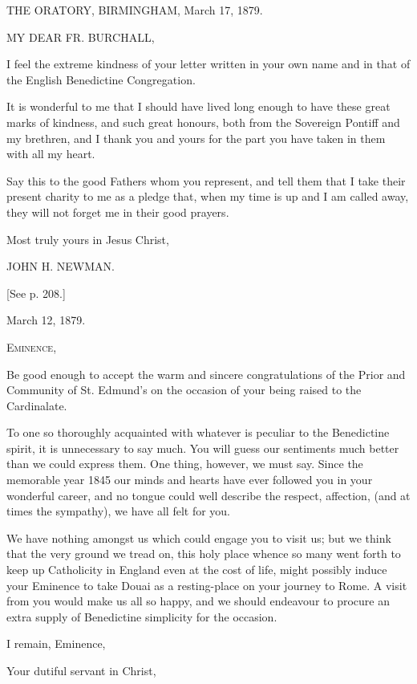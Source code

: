 
THE ORATORY, BIRMINGHAM,
March 17, 1879.

MY DEAR FR.
BURCHALL,

I feel the extreme kindness of your letter written in your own name
and in that of the English Benedictine Congregation.

It is wonderful to me that I should have lived long enough to have
these great marks of kindness, and such great honours, both from the
Sovereign Pontiff and my brethren, and I thank you and yours for
the part you have taken in them with all my heart.

Say this to the good Fathers whom you represent, and tell them that
I take their present charity to me as a pledge that, when my time is
up and I am called away, they will not forget me in their good
prayers.

Most truly yours in Jesus Christ,

JOHN H. NEWMAN.

[See p. 208.]


March 12, 1879.

E\textsc{minence},

Be good enough to accept the warm and sincere congratulations of the
Prior and Community of St. Edmund's on the occasion of your being
raised to the Cardinalate.

To one so thoroughly acquainted with whatever is peculiar to the
Benedictine spirit, it is unnecessary to say much. You will guess our
sentiments much better than we could express them. One thing, however,
we must say. Since the memorable year 1845 our minds and hearts have
ever followed you in your wonderful career, and no tongue could well
describe the respect, affection, (and at times the sympathy), we have
all felt for you.

We have nothing amongst us which could engage you to visit us; but
we think that the very ground we tread on, this holy place whence so
many went forth to keep up Catholicity in England even at the cost of
life, might possibly induce your Eminence to take Douai as a
resting-place on your journey to Rome. A visit from you would make us
all so happy, and we should endeavour to procure an extra supply of
Benedictine simplicity for the occasion.

I remain, Eminence,

Your dutiful servant in Christ,

